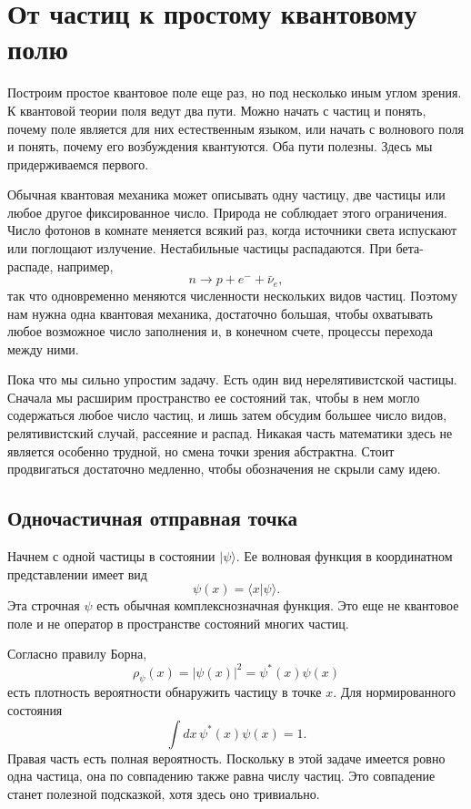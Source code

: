 \chapter{От частиц к простому квантовому полю}

Построим простое квантовое поле еще раз, но под несколько иным углом зрения. К квантовой теории поля ведут два пути. Можно начать с частиц и понять, почему поле является для них естественным языком, или начать с волнового поля и понять, почему его возбуждения квантуются. Оба пути полезны. Здесь мы придерживаемся первого.

Обычная квантовая механика может описывать одну частицу, две частицы или любое другое фиксированное число. Природа не соблюдает этого ограничения. Число фотонов в комнате меняется всякий раз, когда источники света испускают или поглощают излучение. Нестабильные частицы распадаются. При бета-распаде, например,
\begin{equation}
n\longrightarrow p+e^-+\bar{\nu}_e,
\end{equation}
так что одновременно меняются численности нескольких видов частиц. Поэтому нам нужна одна квантовая механика, достаточно большая, чтобы охватывать любое возможное число заполнения и, в конечном счете, процессы перехода между ними.

Пока что мы сильно упростим задачу. Есть один вид нерелятивистской частицы. Сначала мы расширим пространство ее состояний так, чтобы в нем могло содержаться любое число частиц, и лишь затем обсудим большее число видов, релятивистский случай, рассеяние и распад. Никакая часть математики здесь не является особенно трудной, но смена точки зрения абстрактна. Стоит продвигаться достаточно медленно, чтобы обозначения не скрыли саму идею.

\section{Одночастичная отправная точка}

Начнем с одной частицы в состоянии \(|\psi\rangle\). Ее волновая функция в координатном представлении имеет вид
\begin{equation}
\psi(x)=\langle x|\psi\rangle.
\label{eq:l07-wavefunction}
\end{equation}
Эта строчная \(\psi\) есть обычная комплекснозначная функция. Это еще не квантовое поле и не оператор в пространстве состояний многих частиц.

Согласно правилу Борна,
\begin{equation}
\rho_\psi(x)=|\psi(x)|^2=\psi^*(x)\psi(x)
\label{eq:l07-born-density}
\end{equation}
есть плотность вероятности обнаружить частицу в точке \(x\). Для нормированного состояния
\begin{equation}
\int dx\,\psi^*(x)\psi(x)=1.
\label{eq:l07-one-particle-normalization}
\end{equation}
Правая часть есть полная вероятность. Поскольку в этой задаче имеется ровно одна частица, она по совпадению также равна числу частиц. Это совпадение станет полезной подсказкой, хотя здесь оно тривиально.

